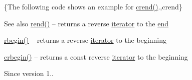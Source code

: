 \{The following code shows an example for {\ttfamily \hyperlink{classnlohmann_1_1basic__json_a5795b029dbf28e0cb2c7a439ec5d0a88}{crend()}}.,crend\}

\begin{DoxySeeAlso}{See also}
\hyperlink{classnlohmann_1_1basic__json_ac77aed0925d447744676725ab0b6d535}{rend()} -- returns a reverse \hyperlink{classnlohmann_1_1basic__json_a099316232c76c034030a38faa6e34dca}{iterator} to the \hyperlink{classnlohmann_1_1basic__json_a13e032a02a7fd8a93fdddc2fcbc4763c}{end} 

\hyperlink{classnlohmann_1_1basic__json_a1ef93e2006dbe52667294f5ef38b0b10}{rbegin()} -- returns a reverse \hyperlink{classnlohmann_1_1basic__json_a099316232c76c034030a38faa6e34dca}{iterator} to the beginning 

\hyperlink{classnlohmann_1_1basic__json_a1e0769d22d54573f294da0e5c6abc9de}{crbegin()} -- returns a const reverse \hyperlink{classnlohmann_1_1basic__json_a099316232c76c034030a38faa6e34dca}{iterator} to the beginning
\end{DoxySeeAlso}
\begin{DoxySince}{Since}
version 1.. 
\end{DoxySince}
